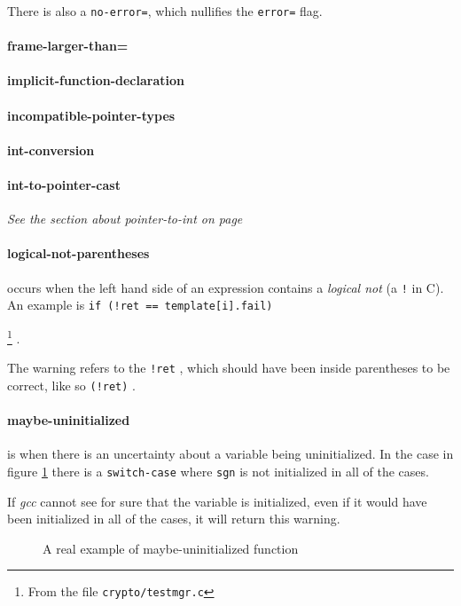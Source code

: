 \documentclass[a4paper,11pt]{report}
\newcommand{\textcode}[1]{
    \fboxsep=1pt
    \texttt{\colorbox{gray!20}{#1}}
}
\newcommand{\figa}{
    \begin{figure}[!htpb]
    \centering
}
\newcommand{\figb}[2]{
    \caption{#1}
    \label{#2}
    \end{figure}
}
\begin{document}
There is also a \texttt{no-error=}, which nullifies the \texttt{error=} flag.


            \paragraph{frame-larger-than=}
            \paragraph{implicit-function-declaration}
            \paragraph{incompatible-pointer-types}
            \paragraph{int-conversion}
            \paragraph{int-to-pointer-cast}
\emph{See the section about pointer-to-int on page \pageref{par:pointertoint}}

            \paragraph{logical-not-parentheses}
occurs when the left hand side of an expression contains a \emph{logical not} 
(a \texttt{!} in C). An example is \textcode{if (!ret == template[i].fail)}
    \footnote{From the file \texttt{crypto/testmgr.c}}
.

The warning refers to the \textcode{!ret}, which should have been inside 
parentheses to be correct, like so \textcode{(!ret)}.


            \paragraph{maybe-uninitialized}
is when there is an uncertainty about a variable being uninitialized. In the 
case in figure \ref{lst:maybeuninitializedreal} there is a 
\texttt{switch-case} where \texttt{sgn} is not initialized in all of the cases.

If \emph{gcc} cannot see for sure that the variable is initialized, 
even if it would have been initialized in all of the cases, it will return this 
warning.

\figa
    
\figb{A real example of maybe-uninitialized function}{lst:maybeuninitializedreal}
\end{document}
